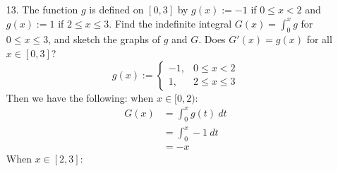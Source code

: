 \documentclass[12pt,letterpaper]{article}
\newcommand{\limx}[2]{\displaystyle\lim\limits_{#1 \to #2}}
\theoremstyle{case}
\theoremstyle{definition}
\begin{document}
\begin{enumerate}
\begin{enumerate}
			\\$F$ is definitely differentiable at points $x \in (0,1) \cup (1,2) \cup (2,3)$ since at those points, $f$ is equal to a polynomial. So, we must now check for the differentiability of $f$ at $x=1$ and $x=2$.
			\[\limx{x}{1^-}\frac{F(x)-F(1)}{x-1}=\limx{x}{1^-}\frac{\frac{x^2}{2}-\frac{1}{2}}{x-1}=\frac{1}{2} \limx{x}{1^-}\frac{\cancel{(x-1)}(x+1)}{\cancel{(x-1)}}=\frac{1}{2} \cdot (1+1) = 1\]
			\[\limx{x}{1^+}\frac{F(x)-F(1)}{x-1}=\limx{x}{1^+}\frac{\left(x-\frac{1}{2}\right)-\frac{3}{2}}{x-1} = 1\]
			Therefore, $F$ is differentiable at $x=1$ and $F'(x)=1$. As for when $x=2$,
			\[\limx{x}{2^-}\frac{F(x)-F(2)}{x-1}=\limx{x}{2^-}\frac{\left(x-\frac{1}{2}\right)-\frac{3}{2}}{x-2}=1\]
			\[\limx{x}{2^+}\frac{F(x)-F(2)}{x-2}=\limx{x}{2^+}\frac{\left(\frac{x^2}{2}-\frac{1}{2}\right)-\frac{1}{2}}{x-2}=2\]
			Therefore, $F$ is not differentiable at $x=2$. Thus,
			\[F'(x):=\begin{cases}
			x, &0 \leq x < 1 \\
			1, &1 \leq x < 2 \\
			x, &2 < x \leq 3
			\end{cases}\]
			And notice that $F'(x)=f(x)$ for $x \in [0,1] \setminus \{2\}$
			\item[13.] The function $g$ is defined on $[0,3]$ by $g(x):=-1$ if $0 \leq x < 2$ and $g(x):=1$ if $2 \leq x \leq 3$. Find the indefinite integral $G(x)=\int_{0}^{x} g$ for $0 \leq x \leq 3$, and sketch the graphs of $g$ and $G$. Does $G'(x)=g(x)$ for all $x \in [0,3]$?
			\[g(x):=\begin{cases}
			-1, &0 \leq x < 2 \\
			1, & 2 \leq x \leq 3
			\end{cases}\]
			Then we have the following: when $x \in [0,2)$:
			\begin{align*}
				G(x) &= \int_{0}^{x} g(t)\ dt \\
				&= \int_{0}^{x} -1\ dt \\
				&= -x
			\end{align*}
			When $x \in [2,3]$:

\end{enumerate}
\end{enumerate}
\end{document}
